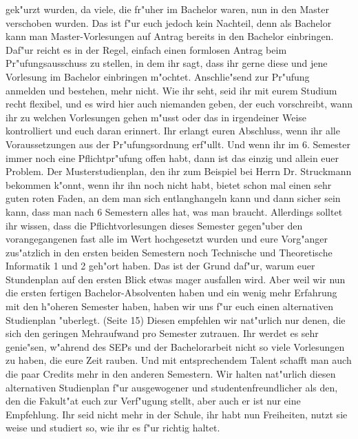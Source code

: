 gek"urzt wurden, da viele, die fr"uher im Bachelor waren, nun in den Master verschoben wurden. Das
ist f"ur euch jedoch kein Nachteil, denn als Bachelor kann man Master-Vorlesungen auf Antrag
bereits in den Bachelor einbringen. Daf"ur reicht es in der Regel, einfach einen formlosen Antrag
beim Pr"ufungsausschuss zu stellen, in dem ihr sagt, dass ihr gerne diese und jene Vorlesung im
Bachelor einbringen m"ochtet. Anschlie"send zur Pr"ufung anmelden und bestehen, mehr nicht.
Wie ihr seht, seid ihr mit eurem Studium recht flexibel, und es wird hier auch niemanden geben, der
euch vorschreibt, wann ihr zu welchen Vorlesungen gehen m"usst oder das in irgendeiner Weise
kontrolliert und euch daran erinnert. Ihr erlangt euren Abschluss, wenn ihr alle Voraussetzungen aus
der Pr"ufungsordnung erf"ullt. Und wenn ihr im 6. Semester immer noch eine Pflichtpr"ufung offen
habt, dann ist das einzig und allein euer Problem.
Der Musterstudienplan, den ihr zum Beispiel bei Herrn Dr. Struckmann bekommen k"onnt, wenn ihr
ihn noch nicht habt, bietet schon mal einen sehr guten roten Faden, an dem man sich entlanghangeln
kann und dann sicher sein kann, dass man nach 6 Semestern alles hat, was man braucht. Allerdings
solltet ihr wissen, dass die Pflichtvorlesungen dieses Semester gegen"uber den vorangegangenen fast
alle im Wert hochgesetzt wurden und eure Vorg"anger zus"atzlich in den ersten beiden Semestern
noch Technische und Theoretische Informatik 1 und 2 geh"ort haben. Das ist der Grund daf"ur,
warum euer Stundenplan auf den ersten Blick etwas mager ausfallen wird. Aber weil wir nun die
ersten fertigen Bachelor-Absolventen haben und ein wenig mehr Erfahrung mit den h"oheren
Semester haben, haben wir uns f"ur euch einen alternativen Studienplan "uberlegt. (Seite 15) Diesen empfehlen
wir nat"urlich nur denen, die sich den geringen Mehraufwand pro Semester zutrauen. Ihr werdet es
sehr genie"sen, w"ahrend des SEPs und der Bachelorarbeit nicht so viele Vorlesungen zu haben, die
eure Zeit rauben. Und mit entsprechendem Talent schafft man auch die paar Credits mehr in den
anderen Semestern. Wir halten nat"urlich diesen alternativen Studienplan f"ur ausgewogener und
studentenfreundlicher als den, den die Fakult"at euch zur Verf"ugung stellt, aber auch er ist nur eine
Empfehlung. Ihr seid nicht mehr in der Schule, ihr habt nun Freiheiten, nutzt sie weise und studiert
so, wie ihr es f"ur richtig haltet.
